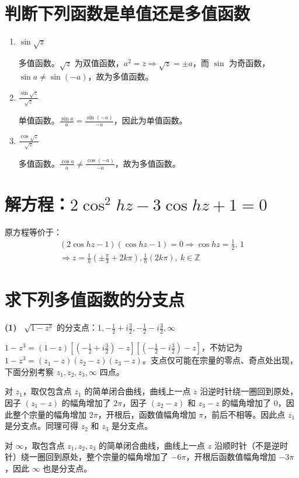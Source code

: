 \documentclass[UTF8]{report}
\def\Z{\mathbb{Z}}
\theoremstyle{MyLineTheoremStyle} %
\theoremstyle{MyBlockTheoremStyle} %
\theoremstyle{MySubsubsectionStyle} %
\begin{document}
\section{判断下列函数是单值还是多值函数}
\begin{enumerate}
\item $\sin \sqrt{z}$

多值函数。$\sqrt{z}$ 为双值函数，$a^2 = z \Longrightarrow  \sqrt{z} = \pm a $，而 $\sin $ 为奇函数，$\sin a \ne \sin (-a)$，故为多值函数。
\item $\frac{\sin \sqrt{z} }{\sqrt{z} }$

单值函数。$\frac{\sin a}{a} = \frac{\sin (-a)}{-a}$，因此为单值函数。
\item $\frac{\cos \sqrt{z} }{\sqrt{z} }$

多值函数。$\frac{\cos a}{a} \ne \frac{\cos (-a)}{-a}$，故为多值函数。
\end{enumerate}

\section{解方程：$2\cos^2hz - 3\cos hz + 1 = 0$}
原方程等价于：
\begin{gather}
(2\cos hz - 1)(\cos hz - 1) = 0 \Longrightarrow  \cos hz = \frac{1}{2},\, 1 \\ 
\Longrightarrow  z = \frac{1}{h}(\pm\frac{\pi}{3} + 2k\pi), \frac{1}{h}(2k\pi),\ k \in \Z
\end{gather}

\section{求下列多值函数的分支点}

\textbf{(1)\ } $\sqrt{1 - z^3}$ 的分支点：$1, -\frac{1}{2} + i\frac{3}{2}, -\frac{1}{2} - i\frac{3}{2}, \infty$

$1 - z^3 = (1-z)[(-\frac{1}{2} + i\frac{3}{2}) -z][(-\frac{1}{2} - i\frac{3}{2})-z]$，不妨记为 $1 - z^3 = (z_1 - z)(z_2 - z)(z_3 - z)$。支点仅可能在宗量的零点、奇点处出现，下面分别考察 $z_1,z_2,z_3, \infty$ 四点。

对 $z_1$，取仅包含点 $z_1$ 的简单闭合曲线，曲线上一点 $z$ 沿逆时针绕一圈回到原处，因子 $(z_1 - z)$ 的幅角增加了 $2\pi$，因子 $(z_2 - z)$ 和 $z_3 - z$ 的幅角增加了 0，因此整个宗量的幅角增加 $2\pi$，开根后，函数值幅角增加 $\pi$，前后不相等。因此点 $z_1$ 是分支点。同理可得 $z_2$ 和 $z_3 $ 是分支点。

对 $\infty$，取包含点 $z_1, z_2, z_3 $ 的简单闭合曲线，曲线上一点 $z$ 沿顺时针（不是逆时针）绕一圈回到原处，整个宗量的幅角增加了 $-6\pi$，开根后函数值幅角增加 $-3\pi$，因此 $\infty$ 也是分支点。
\end{document}
